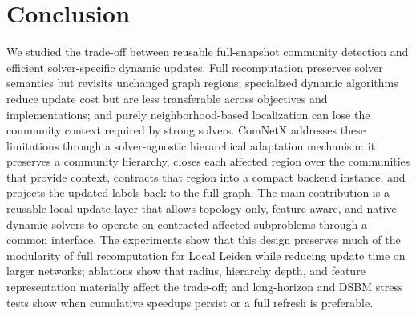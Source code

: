 \documentclass[conference]{IEEEtran}
\theoremstyle{definition}
\begin{document}
\section{Conclusion} \label{S:6}
We studied the trade-off between reusable full-snapshot community detection and
efficient solver-specific dynamic updates. Full recomputation preserves solver
semantics but revisits unchanged graph regions; specialized dynamic algorithms
reduce update cost but are less transferable across objectives and
implementations; and purely neighborhood-based localization can lose the
community context required by strong solvers. ComNetX addresses these
limitations through a solver-agnostic hierarchical adaptation mechanism: it
preserves a community hierarchy, closes each affected region over the
communities that provide context, contracts that region into a compact backend
instance, and projects the updated labels back to the full graph.
The main contribution is a reusable local-update layer that allows
topology-only, feature-aware, and native dynamic solvers to operate on
contracted affected subproblems through a common interface. The experiments show
that this design preserves much of the modularity of full recomputation for
Local Leiden while reducing update time on larger networks; ablations show that
radius, hierarchy depth, and feature representation materially affect the
trade-off; and long-horizon and DSBM stress tests show when cumulative speedups
persist or a full refresh is preferable.
\begingroup
\setlength{\labelsep}{0.12em}
\end{document}
